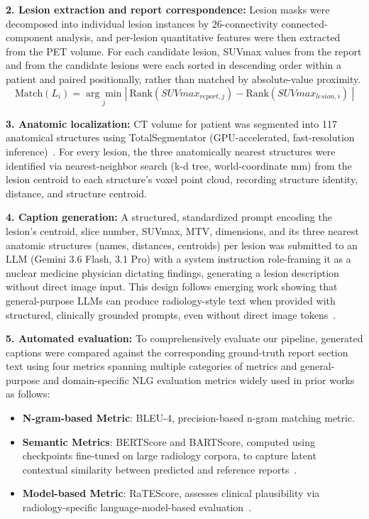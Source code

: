 \documentclass[10pt]{article}
\begin{document}
\textbf{2. Lesion extraction and report correspondence:} 
Lesion masks were decomposed into individual lesion instances by 26-connectivity connected-component analysis, and per-lesion quantitative features were then extracted from the PET volume. For each candidate lesion, SUVmax values from the report and from the candidate lesions were each sorted in descending order within a patient and paired positionally, rather than matched by absolute-value proximity.
\begin{equation}
  \text{Match}(L_{i}) = \underset{j}{\arg\min} \left| \ \text{Rank}(SUVmax_{report,j}) - \text{Rank}(SUVmax_{lesion,i}) \ \right|
\end{equation}


\textbf{3. Anatomic localization:} 
CT volume for patient was segmented into 117 anatomical structures using TotalSegmentator (GPU-accelerated, fast-resolution inference)~\cite{ref:total}. For every lesion, the three anatomically nearest structures were identified via nearest-neighbor search (k-d tree, world-coordinate mm) from the lesion centroid to each structure's voxel point cloud, recording structure identity, distance, and structure centroid.


\textbf{4. Caption generation:} 
A structured, standardized prompt encoding the lesion's centroid, slice number, SUVmax, MTV, dimensions, and its three nearest anatomic structures (names, distances, centroids) per lesion was submitted to an LLM (Gemini 3.6 Flash, 3.1 Pro) with a system instruction role-framing it as a nuclear medicine physician dictating findings, generating a lesion description without direct image input. This design follows emerging work showing that general-purpose LLMs can produce radiology-style text when provided with structured, clinically grounded prompts, even without direct image tokens~\cite{ref:llm_rad_survey,ref:med_flamingo}.


\textbf{5. Automated evaluation:}
To comprehensively evaluate our pipeline, generated captions were compared against the corresponding ground-truth report section text using four metrics spanning multiple categories of metrics and general-purpose and domain-specific NLG evaluation metrics widely used in prior works as follows:
\begin{itemize}
  \setlength\itemsep{0em}
  \item \textbf{N-gram-based Metric}: BLEU-4, precision-based n-gram matching metric. 
  \item \textbf{Semantic Metrics}: BERTScore and BARTScore, computed using checkpoints fine-tuned on large radiology corpora, to capture latent contextual similarity between predicted and reference reports~\cite{ref:bert,ref:bartscore}.
  \item \textbf{Model-based Metric}: RaTEScore, assesses clinical plausibility via radiology-specific language-model-based evaluation~\cite{ref:rab}.
\end{itemize}
\end{document}
